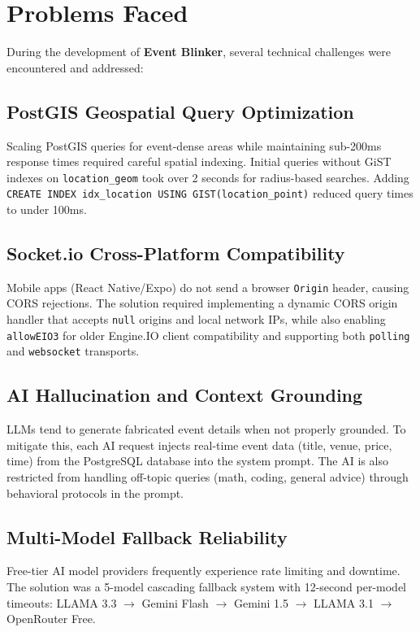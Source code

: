 \chapter{Problems Faced}

During the development of \textbf{Event Blinker}, several technical challenges were encountered and addressed:

\section{PostGIS Geospatial Query Optimization}
Scaling PostGIS queries for event-dense areas while maintaining sub-200ms response times required careful spatial indexing. Initial queries without GiST indexes on \texttt{location\_geom} took over 2 seconds for radius-based searches. Adding \texttt{CREATE INDEX idx\_location USING GIST(location\_point)} reduced query times to under 100ms.

\section{Socket.io Cross-Platform Compatibility}
Mobile apps (React Native/Expo) do not send a browser \texttt{Origin} header, causing CORS rejections. The solution required implementing a dynamic CORS origin handler that accepts \texttt{null} origins and local network IPs, while also enabling \texttt{allowEIO3} for older Engine.IO client compatibility and supporting both \texttt{polling} and \texttt{websocket} transports.

\section{AI Hallucination and Context Grounding}
LLMs tend to generate fabricated event details when not properly grounded. To mitigate this, each AI request injects real-time event data (title, venue, price, time) from the PostgreSQL database into the system prompt. The AI is also restricted from handling off-topic queries (math, coding, general advice) through behavioral protocols in the prompt.

\section{Multi-Model Fallback Reliability}
Free-tier AI model providers frequently experience rate limiting and downtime. The solution was a 5-model cascading fallback system with 12-second per-model timeouts: LLAMA 3.3 $\rightarrow$ Gemini Flash $\rightarrow$ Gemini 1.5 $\rightarrow$ LLAMA 3.1 $\rightarrow$ OpenRouter Free.


